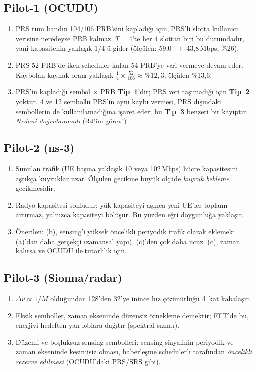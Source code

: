 \subsection*{Pilot-1 (OCUDU)}
\begin{enumerate}
\item PRS tüm bandın 104/106 PRB'sini kapladığı için, PRS'li slotta kullanıcı verisine neredeyse PRB kalmaz. $T=4$'te her 4 slottan biri bu durumdadır, yani kapasitenin yaklaşık $1/4$'ü gider (ölçülen: 59,0 $\rightarrow$ 43,8\,Mbps, \%26).
\item PRS 52 PRB'de iken scheduler kalan 54 PRB'ye veri vermeye devam eder. Kaybolan kaynak oranı yaklaşık $\frac14\times\frac{52}{106}\approx\%12{,}3$; ölçülen \%13,6.
\item PRS'in kapladığı sembol $\times$ PRB \textbf{Tip~1}'dir; PRS veri taşımadığı için \textbf{Tip~2} yoktur. 4 ve 12 sembollü PRS'in aynı kaybı vermesi, PRS dışındaki sembollerin de kullanılamadığına işaret eder; bu \textbf{Tip~3} benzeri bir kayıptır. \emph{Nedeni doğrulanmadı} (R4'ün görevi).
\end{enumerate}

\subsection*{Pilot-2 (ns-3)}
\begin{enumerate}
\item Sunulan trafik (UE başına yaklaşık 10 veya 102\,Mbps) hücre kapasitesini aştıkça kuyruklar uzar. Ölçülen gecikme büyük ölçüde \emph{kuyruk bekleme} gecikmesidir.
\item Radyo kapasitesi sonludur; yük kapasiteyi aşınca yeni UE'ler toplamı artırmaz, yalnızca kapasiteyi bölüşür. Bu yüzden eğri doygunluğa yaklaşır.
\item Önerilen: (b), sensing'i yüksek öncelikli periyodik trafik olarak eklemek: (a)'dan daha gerçekçi (zamansal yapı), (c)'den çok daha ucuz. (c), zaman kalırsa ve OCUDU ile tutarlılık için.
\end{enumerate}

\subsection*{Pilot-3 (Sionna/radar)}
\begin{enumerate}
\item $\Delta v \propto 1/M$ olduğundan 128'den 32'ye inince hız çözünürlüğü 4~kat kabalaşır.
\item Eksik semboller, zaman ekseninde düzensiz örnekleme demektir; FFT'de bu, enerjiyi hedeften yan loblara dağıtır (spektral sızıntı).
\item Düzenli ve boşluksuz sensing sembolleri: sensing sinyalinin periyodik ve zaman ekseninde kesintisiz olması, haberleşme scheduler'ı tarafından \emph{öncelikli rezerve edilmesi} (OCUDU'daki PRS/SRS gibi).
\end{enumerate}

